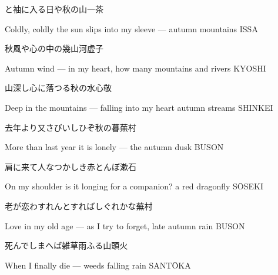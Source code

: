 \begin{haiku}
    {\FH {}と袖に入る日や秋の山}\hfill{\FH 一茶}

    \vin{} Coldly, coldly
    \vin{} \vin{} the sun slips into my sleeve ---
    \vin{} \vin{} \vin{} autumn mountains \hspace{\fill} ISSA
\end{haiku}

\begin{haiku}
    {\FH 秋風や心の中の幾山河}\hfill{\FH 虚子}

    \vin{} Autumn wind ---
    \vin{} \vin{} in my heart, how many
    \vin{} \vin{} \vin{} mountains and rivers \hspace{\fill} KYOSHI
\end{haiku}

\begin{haiku}
    {\FH 山深し心に落つる秋の水}\hfill{\FH 心敬}

    \vin{} Deep in the mountains ---
    \vin{} \vin{} falling into my heart
    \vin{} \vin{} \vin{} autumn streams \hspace{\fill} SHINKEI
\end{haiku}

\begin{haiku}
    {\FH 去年より又さびいしひぞ秋の暮}\hfill{\FH 蕪村}

    \vin{} More than last year
    \vin{} \vin{} it is lonely ---
    \vin{} \vin{} \vin{} the autumn dusk \hspace{\fill} BUSON
\end{haiku}

\begin{haiku}
    {\FH 肩に来て人なつかしき赤とんぼ}\hfill{\FH 漱石}

    \vin{} On my shoulder
    \vin{} \vin{} is it longing for a companion?
    \vin{} \vin{} \vin{} a red dragonfly \hspace{\fill} S\={O}SEKI
\end{haiku}

\begin{haiku}
    {\FH 老が恋わすれんとすればしぐれかな}\hfill{\FH 蕪村}

    \vin{} Love in my old age ---
    \vin{} \vin{} as I try to forget,
    \vin{} \vin{} \vin{} late autumn rain \hspace{\fill} BUSON
\end{haiku}

\begin{haiku}
    {\FH 死んでしまへば雑草雨ふる}\hfill{\FH 山頭火}

    \vin{} When I finally die ---
    \vin{} \vin{} weeds
    \vin{} \vin{} \vin{} falling rain \hspace{\fill} SANT\={O}KA
\end{haiku}

